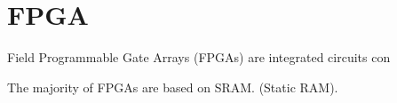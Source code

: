 \section{FPGA}

Field Programmable Gate Arrays (FPGAs) are integrated circuits con

The majority of FPGAs are based on SRAM. (Static RAM).
